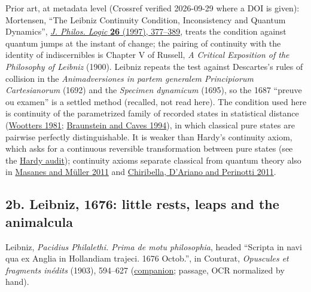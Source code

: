 \documentclass[11pt,a4paper]{article}
\begin{document}
Prior art, at metadata level (Crossref verified 2026-09-29 where a DOI
is given): Mortensen, ``The Leibniz Continuity Condition, Inconsistency
and Quantum Dynamics'',
\href{https://doi.org/10.1023/A:1004275928191}{\emph{J. Philos. Logic}
\textbf{26} (1997), 377--389}, treats the condition against quantum
jumps at the instant of change; the pairing of continuity with the
identity of indiscernibles is Chapter V of Russell, \emph{A Critical
Exposition of the Philosophy of Leibniz} (1900). Leibniz repeats the
test against Descartes's rules of collision in the \emph{Animadversiones
in partem generalem Principiorum Cartesianorum} (1692) and the
\emph{Specimen dynamicum} (1695), so the 1687 ``preuve ou examen'' is a
settled method (recalled, not read here). The condition used here is
continuity of the parametrized family of recorded states in statistical
distance (\href{https://doi.org/10.1103/PhysRevD.23.357}{Wootters 1981};
\href{https://doi.org/10.1103/PhysRevLett.72.3439}{Braunstein and Caves
1994}), in which classical pure states are pairwise perfectly
distinguishable. It is weaker than Hardy's continuity axiom, which asks
for a continuous reversible transformation between pure states (see the
\href{classical-orientation-closure.md\#what-reconstruction-premises-add}{Hardy
audit}); continuity axioms separate classical from quantum theory also
in \href{https://doi.org/10.1088/1367-2630/13/6/063001}{Masanes and
Müller 2011} and
\href{https://doi.org/10.1103/PhysRevA.84.012311}{Chiribella, D'Ariano
and Perinotti 2011}.

\hypertarget{b.-leibniz-1676-little-rests-leaps-and-the-animalcula}{%
\subsection{2b. Leibniz, 1676: little rests, leaps and the
animalcula}\label{b.-leibniz-1676-little-rests-leaps-and-the-animalcula}}

Leibniz, \emph{Pacidius Philalethi. Prima de motu philosophia}, headed
``Scripta in navi qua ex Anglia in Hollandiam trajeci. 1676 Octob.'', in
Couturat, \emph{Opuscules et fragments inédits} (1903), 594--627
(\href{../docs/classics/Leibniz_Pacidius_1676_Couturat1903_OCR.md}{companion};
passage, OCR normalized by hand).
\end{document}
